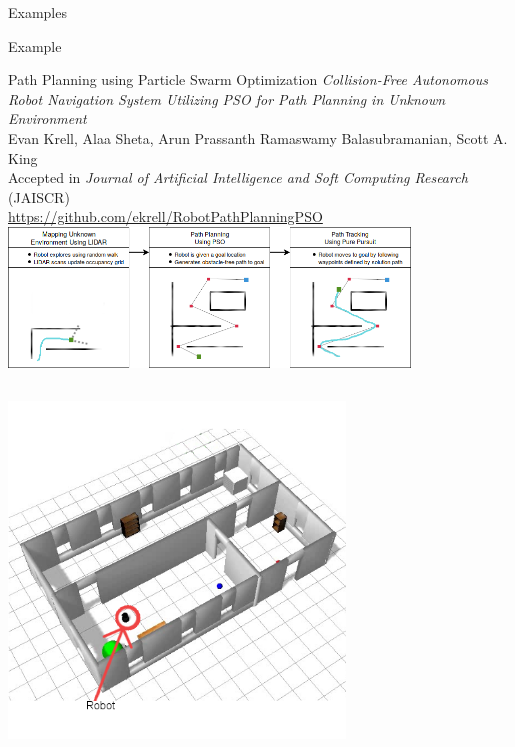 \documentclass[9pt]{beamer}
\begin{document}
\begin{section}{Examples}
    \begin{frame}{Example}
        \begin{block}{Path Planning using Particle Swarm Optimization}
            {\small 
            \textit{Collision-Free Autonomous Robot Navigation System Utilizing PSO for Path Planning in Unknown Environment} \\
            Evan Krell, Alaa Sheta, Arun Prassanth Ramaswamy Balasubramanian, Scott A. King \\
            Accepted in \textit{Journal of Artificial Intelligence and Soft Computing Research} (JAISCR) \\
            \url{https://github.com/ekrell/RobotPathPlanningPSO} \\
            }
            \centering
            \includegraphics[width=0.8\textwidth,trim={0cm 7cm 0cm 0cm},clip]{sysoverview(1).png}
            \begin{columns}
                \begin{column}{0.5\textwidth}
                    \centering
                    \includegraphics[width=0.7\textwidth,trim={0cm 0cm 0cm 0cm},clip]{Setup1.png}
                \end{column}
                \begin{column}{0.5\textwidth}

\end{column}
\end{columns}
\end{block}
\end{frame}
\end{section}
\end{document}
